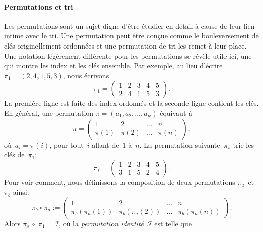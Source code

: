 \paragraph{Permutations et tri}

Les permutations sont un sujet digne d'être
étudier en détail à cause de leur lien intime avec le tri. Une
permutation peut être conçue comme le bouleversement de clés
originellement ordonnées et une permutation de tri les remet à leur
place. Une notation légèrement différente pour les permutations se
révèle utile ici, une qui montre les index et les clés ensemble. Par
exemple, au lieu d'écrire \(\pi_1 = (2,4,1,5,3)\), nous écrivons
\begin{equation*}
\pi_1 =
\begin{pmatrix}
1 & 2 & 3 & 4 & 5\\
2 & 4 & 1 & 5 & 3
\end{pmatrix}.
\end{equation*}
La première ligne est faite des index ordonnés et la seconde ligne
contient les clés. En général, une permutation \(\pi =
(a_1,a_2,\dots,a_n)\) équivaut à
\begin{equation*}
\pi =
\begin{pmatrix}
     1 &      2 & \dots &     n\\
\pi(1) & \pi(2) & \dots & \pi(n)
\end{pmatrix},
\end{equation*}
où~\(a_i = \pi(i)\), pour tout~\(i\) allant de~\(1\) à~\(n\). La
permutation suivante~\(\pi_s\) trie les clés de~\(\pi_1\):
\begin{equation*}
\pi_s =
\begin{pmatrix}
1 & 2 & 3 & 4 & 5\\
3 & 1 & 5 & 2 & 4
\end{pmatrix}.
\end{equation*}
Pour voir comment, nous définissons la composition
 de deux
permutations \(\pi_a\)~et~\(\pi_b\) ainsi:
\begin{equation*}
\pi_b \circ \pi_a :=
\begin{pmatrix}
              1 &               2 & \dots & n\\
\pi_b(\pi_a(1)) & \pi_b(\pi_a(2)) & \dots & \pi_b(\pi_a(n)) 
\end{pmatrix}.
\end{equation*}
Alors \(\pi_s~\circ~\pi_1 = \mathcal{I}\), où la \emph{permutation
  identité}~\(\mathcal{I}\) est telle que
